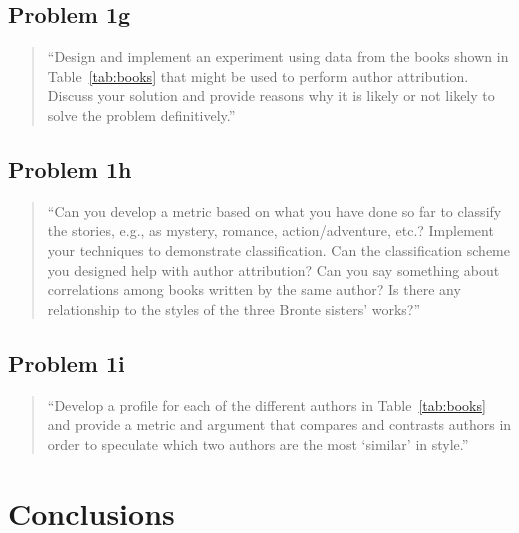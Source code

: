 \documentclass[conference]{IEEEtran}
\begin{document}
\subsection{Problem 1g}

\begin{quote}
``Design and implement an experiment using data from the books shown in Table~\ref{tab:books}
that might be used to perform author attribution. Discuss your solution and provide reasons 
why it is likely or not likely to solve the problem definitively.''
\end{quote}

\begin{framed}
\fontsize{5.65}{6.78}\selectfont

\end{framed}

\subsection{Problem 1h}

\begin{quote}
``Can you develop a metric based on what you have done so far to classify the stories, e.g., 
as mystery, romance, action/adventure, etc.? Implement your techniques to demonstrate 
classification. Can the classification scheme you designed help with author attribution? 
Can you say something about correlations among books written by the same author? 
Is there any relationship to the styles of the three Bronte sisters' works?''
\end{quote}

\begin{framed}
\fontsize{5.65}{6.78}\selectfont

\end{framed}

\subsection{Problem 1i}

\begin{quote}
``Develop a profile for each of the different authors in Table~\ref{tab:books} and provide 
a metric and argument that compares and contrasts authors in order to speculate which 
two authors are the most `similar' in style.''
\end{quote}

\begin{framed}
\fontsize{5.65}{6.78}\selectfont

\end{framed}


\section{Conclusions}






\begin{framed}
\fontsize{5.65}{6.78}\selectfont

\end{framed}
\end{document}
